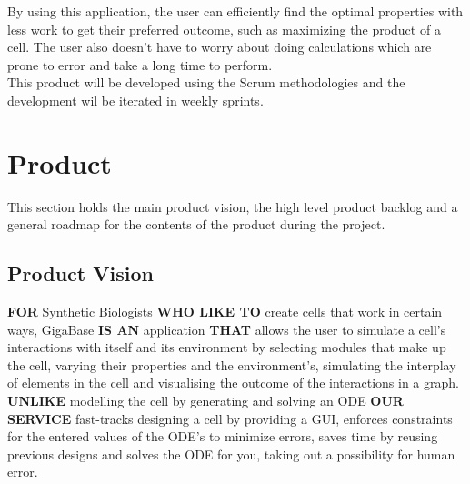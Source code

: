 \documentclass[10pt,a4paper]{report}
\begin{document}
By using this application, the user can efficiently find the optimal properties with less work to get their preferred outcome, such as maximizing the product of a cell. The user also doesn't have to worry about doing calculations which are prone to error and take a long time to perform.
\\

This product will be developed using the Scrum methodologies and the development wil be iterated in weekly sprints.

	\clearpage

	\section{Product}
		This section holds the main product vision, the high level product backlog and a general roadmap for the contents of the product during the project.
		\subsection{Product Vision}

			\textbf{FOR} Synthetic Biologists \textbf{WHO LIKE TO} create cells that work in certain ways, GigaBase \textbf{IS AN} application \textbf{THAT} allows the user to simulate a cell's interactions with itself and its environment by selecting modules that make up the cell, varying their properties and the environment’s, simulating the interplay of elements in the cell and visualising the outcome of the interactions in a graph. \textbf{UNLIKE} modelling the cell by generating and solving an ODE \textbf{OUR SERVICE} fast-tracks designing a cell by providing a GUI, enforces constraints for the entered values of the ODE's to minimize errors, saves time by reusing previous designs and solves the ODE for you, taking out a possibility for human error.
\end{document}
